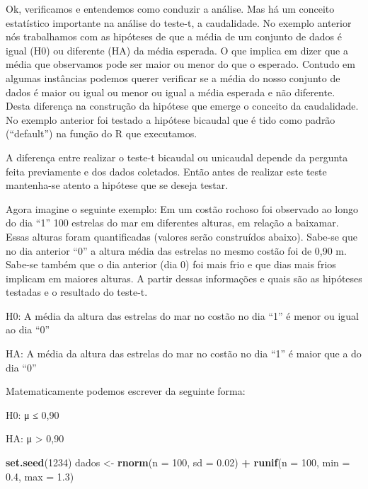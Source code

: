 \documentclass[]{book}
\newenvironment{Shaded}{\begin{snugshade}}{\end{snugshade}}
\newcommand{\DataTypeTok}[1]{\textcolor[rgb]{0.13,0.29,0.53}{#1}}
\newcommand{\DecValTok}[1]{\textcolor[rgb]{0.00,0.00,0.81}{#1}}
\newcommand{\FloatTok}[1]{\textcolor[rgb]{0.00,0.00,0.81}{#1}}
\newcommand{\KeywordTok}[1]{\textcolor[rgb]{0.13,0.29,0.53}{\textbf{#1}}}
\newcommand{\NormalTok}[1]{#1}
\newcommand{\OperatorTok}[1]{\textcolor[rgb]{0.81,0.36,0.00}{\textbf{#1}}}
\newcommand{\StringTok}[1]{\textcolor[rgb]{0.31,0.60,0.02}{#1}}
\begin{document}
Ok, verificamos e entendemos como conduzir a análise. Mas há um conceito estatístico importante na análise do teste-t, a caudalidade. No exemplo anterior nós trabalhamos com as hipóteses de que a média de um conjunto de dados é igual (H0) ou diferente (HA) da média esperada. O que implica em dizer que a média que observamos pode ser maior ou menor do que o esperado. Contudo em algumas instâncias podemos querer verificar se a média do nosso conjunto de dados é maior ou igual ou menor ou igual a média esperada e não diferente. Desta diferença na construção da hipótese que emerge o conceito da caudalidade. No exemplo anterior foi testado a hipótese bicaudal que é tido como padrão (``default'') na função do R que executamos.

A diferença entre realizar o teste-t bicaudal ou unicaudal depende da pergunta feita previamente e dos dados coletados. Então antes de realizar este teste mantenha-se atento a hipótese que se deseja testar.

Agora imagine o seguinte exemplo: Em um costão rochoso foi observado ao longo do dia ``1'' 100 estrelas do mar em diferentes alturas, em relação a baixamar. Essas alturas foram quantificadas (valores serão construídos abaixo). Sabe-se que no dia anterior ``0'' a altura média das estrelas no mesmo costão foi de 0,90 m. Sabe-se também que o dia anterior (dia 0) foi mais frio e que dias mais frios implicam em maiores alturas. A partir dessas informações e quais são as hipóteses testadas e o resultado do teste-t.

H0: A média da altura das estrelas do mar no costão no dia ``1'' é menor ou igual ao dia ``0''

HA: A média da altura das estrelas do mar no costão no dia ``1'' é maior que a do dia ``0''

Matematicamente podemos escrever da seguinte forma:

H0: μ ≤ 0,90

HA: μ \textgreater{} 0,90

\begin{Shaded}
\begin{Highlighting}[]
\KeywordTok{set.seed}\NormalTok{(}\DecValTok{1234}\NormalTok{)}
\NormalTok{dados <-}\StringTok{ }\KeywordTok{rnorm}\NormalTok{(}\DataTypeTok{n =} \DecValTok{100}\NormalTok{, }\DataTypeTok{sd =} \FloatTok{0.02}\NormalTok{) }\OperatorTok{+}\StringTok{ }\KeywordTok{runif}\NormalTok{(}\DataTypeTok{n =} \DecValTok{100}\NormalTok{, }\DataTypeTok{min =} \FloatTok{0.4}\NormalTok{, }\DataTypeTok{max =} \FloatTok{1.3}\NormalTok{)}
\end{Highlighting}
\end{Shaded}
\end{document}
